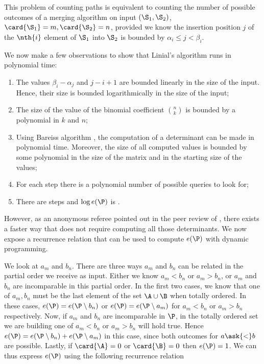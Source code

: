 This problem of counting paths is equivalent to counting the number of possible
outcomes of a merging algorithm on input \((\S_1,\S_2)\), \(\card{\S_1} = m,
\card{\S_2} = n\), provided we know the insertion position \(j\) of the
\(\nth{i}\) element of \(\S_1\) into \(\S_2\) is bounded by \(\alpha_i \le j <
\beta_i\).

We now make a few observations to show that Linial's algorithm runs in
polynomial time:

\begin{enumerate}
\item The values \(\beta_i - \alpha_j\) and \(j - i + 1\) are bounded
linearly in the size of the input. Hence, their size is bounded
logarithmically in the size of the input;
\item The size of the value of the binomial coefficient \(\binom{n}{k}\) is
bounded by a polynomial in \(k\) and \(n\);
\item Using Bareiss algorithm \cite{bareiss:1968}, the computation of a
determinant can be made in polynomial time. Moreover, the size of all computed
values is bounded by some polynomial in the size of the matrix and in the starting
size of the values;
\item For each step there is a polynomial number of possible queries to look for;
\item There are  steps and \(\log e(\P)\) is .
\end{enumerate}

However, as an anonymous referee pointed out in the peer review of
\citet*{cardinal:2013}, there exists a faster way that does not require computing
all those determinants. We now expose a recurrence relation that can be used
to compute \(e(\P)\) with dynamic programming.

We look at \(a_m\) and \(b_n\). There are three ways \(a_m\) and \(b_n\) can be
related in the partial order we receive as input. Either we know \(a_m < b_n\)
or \(a_m > b_n\), or \(a_m\) and \(b_n\) are incomparable in this partial
order. In the first two cases, we know that one of \(a_m,b_n\) must be the last
element of the set \(\A \cup \B\) when totally ordered. In these cases, \(e(\P) =
e(\P \setminus b_n)\) or \(e(\P) = e(\P \setminus a_m)\) for \(a_m < b_n\) or
\(a_m > b_n\) respectively. Now, if \(a_m\) and \(b_n\) are incomparable in
\(\P\), in the totally ordered set we are building one of \(a_m < b_n\) or \(a_m
> b_n\) will hold true. Hence \(e(\P) = e(\P \setminus b_n) + e(\P \setminus
a_m)\) in this case, since both outcomes for \(a \ask{<} b\) are possible.
Lastly, if \(\card{\A} = 0\) or \(\card{\B} = 0\) then \(e(\P) = 1\). We can thus
express \(e(\P)\) using the following recurrence relation

